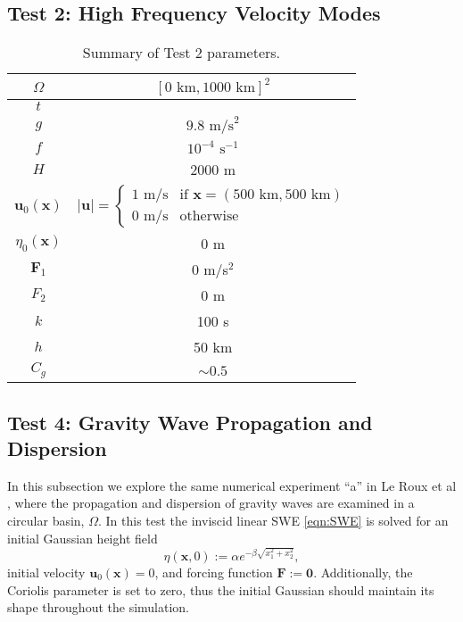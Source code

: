 \subsection{Test 2: High Frequency Velocity Modes}
  \def\arraystretch{1.25} %
  \begin{table}[H]
    \begin{center}
      \begin{tabular}{|c|c|}
        \hline
        $\Omega$ & $[0\text{ km}, 1000\text{ km}]^2$ \\ \hline
        $t$ &  \\ \hline
        $g$ & $9.8\text{ m/s}^2$ \\ \hline 
        $f$ & $10^{-4}\text{ s}^{-1}$ \\ \hline
        $H$ & 2000 m \\ \hline
        $\mathbf{u}_0(\mathbf{x})$ & 
          $\left|\mathbf{u}\right| = 
            \begin{cases}
              1\text{ m/s} & \text{if }\mathbf{x}=(500\text{ km}, 500\text{ km}) \\ 
              0\text{ m/s} & \text{otherwise}
            \end{cases}$ \\ \hline
          $\eta_0(\mathbf{x})$ & 0 m \\ \hline
        $\mathbf{F}_1$ & 0 m/s$^2$\\ \hline
        $F_2$ & 0 m\\ \hline
        $k$ & 100 s \\ \hline
        $h$ & 50 km \\ \hline
        $C_g$ & $\sim 0.5$ \\ \hline
      \end{tabular}
      \caption{Summary of Test 2 parameters.}
      \label{tab:HFVelocityParams}
    \end{center}
  \end{table}

\subsection{Test 4: Gravity Wave Propagation and Dispersion} \label{sse:GravityWaves}
  In this subsection we explore the same numerical experiment ``a'' in Le Roux
  et al \cite{Le-Roux1998}, where the propagation and dispersion of gravity
  waves are examined in a circular basin, $\Omega$. In this test the inviscid
  linear SWE \eqref{eqn:SWE} is solved for an initial Gaussian height field
  \begin{equation}
    \eta(\mathbf{x},0) := \alpha e^{-\beta \sqrt{x_1^2 + x_2^2}},
    \label{eqn:Guass}
  \end{equation}
  initial velocity $\mathbf{u}_0(\mathbf{x})=0$, and forcing function
  $\mathbf{F}:=\mathbf{0}$. Additionally, the Coriolis parameter is set to zero,
  thus the initial Gaussian should maintain its shape throughout the simulation.

